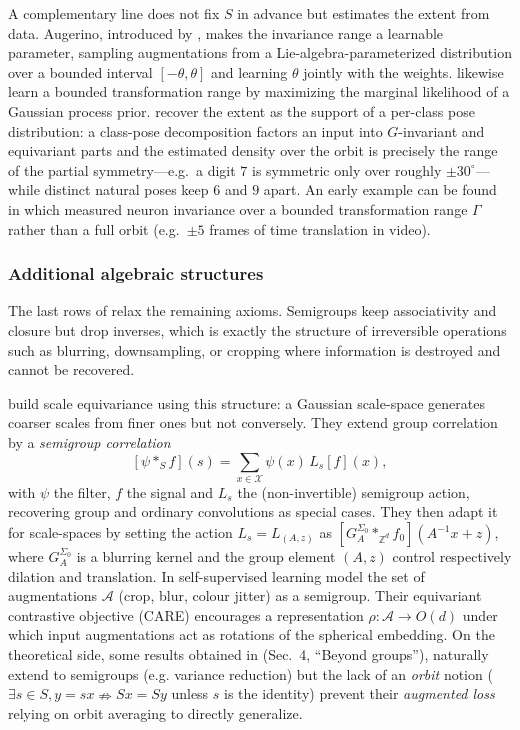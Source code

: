 \documentclass[mathematics,review,submit,moreauthors]{Definitions/mdpi}
\begin{document}
A complementary line does not fix $S$ in advance but estimates the extent from data.
Augerino, introduced by \citet{benton2020anips}, makes the invariance range a learnable parameter, sampling augmentations from a Lie-algebra-parameterized distribution over a bounded interval $[-\theta,\theta]$ and learning $\theta$ jointly with the weights.
\citet{vanderwilk2018anips} likewise learn a bounded transformation range by maximizing the marginal likelihood of a Gaussian process prior.
\citet{urbano2026} recover the extent as the support of a per-class pose distribution: a class-pose decomposition factors an input into $G$-invariant and equivariant parts and the estimated density over the orbit is precisely the range of the partial symmetry---e.g.\ a digit $7$ is symmetric only over roughly $\pm 30^\circ$---while distinct natural poses keep $6$ and $9$ apart.
An early example can be found in \citep{goodfellow2009anips} which measured neuron invariance over a bounded transformation range $\Gamma$ rather than a full orbit (e.g.\ $\pm 5$ frames of time translation in video).

\subsubsection{Additional algebraic structures}
The last rows of  relax the remaining axioms.
Semigroups keep associativity and closure but drop inverses, which is exactly the structure of irreversible operations such as blurring, downsampling, or cropping where information is destroyed and cannot be recovered.

\citet{worrall2019anips} build scale equivariance using this structure: a Gaussian scale-space generates coarser scales from finer ones but not conversely.
They extend group correlation by a \emph{semigroup correlation}
$$[\psi *_{S} f](s)=\sum_{x\in \mathcal{X}}\psi(x)\,L_{s}[f](x),$$
with $\psi$ the filter, $f$ the signal and $L_s$ the (non-invertible) semigroup action, recovering group and ordinary convolutions as special cases. 
They then adapt it for scale-spaces by setting the action $L_s=L_{(A,z)}$ as $[G_{A}^{\Sigma_{0}}*_{\mathbb{Z}^{d}}f_0](A^{-1}x+z)$, where $G_{A}^{\Sigma_{0}}$ is a blurring kernel and the group element $(A,z)$ control respectively dilation and translation.
In self-supervised learning \citet{gupta2023a} model the set of augmentations $\mathcal{A}$ (crop, blur, colour jitter) as a semigroup.
Their equivariant contrastive objective (CARE) encourages a representation $\rho:\mathcal{A}\to O(d)$ under which input augmentations act as rotations of the spherical embedding.
On the theoretical side, some results obtained in \citep{chen2020} (Sec.~4, ``Beyond groups''), naturally extend to semigroups (e.g. variance reduction) but the lack of an \emph{orbit} notion ($\exists s \in S, y=sx \nRightarrow Sx=Sy$ unless $s$ is the identity) prevent their \textit{augmented loss} relying on orbit averaging to directly generalize.
\end{document}
